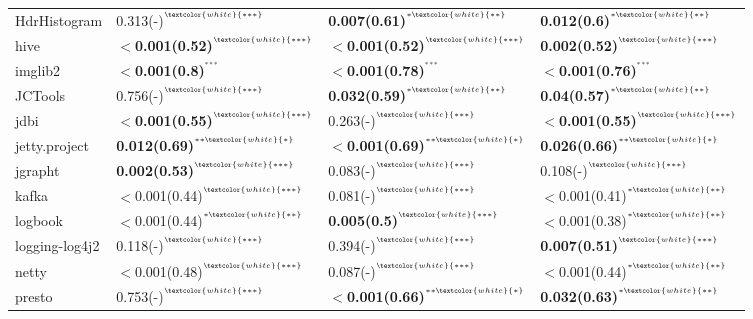 \begin{tabular}{llll}
HdrHistogram        &  0.313(-)\tiny{$^{^{\textcolor{white}{***}}}$} &  \textbf{0.007(0.61)}\tiny{$^{^{*\textcolor{white}{**}}}$} &  \textbf{0.012(0.6)}\tiny{$^{^{*\textcolor{white}{**}}}$} \\
hive                &  \textbf{$<$0.001(0.52)}\tiny{$^{^{\textcolor{white}{***}}}$} &  \textbf{$<$0.001(0.52)}\tiny{$^{^{\textcolor{white}{***}}}$} &  \textbf{0.002(0.52)}\tiny{$^{^{\textcolor{white}{***}}}$} \\
imglib2             &  \textbf{$<$0.001(0.8)}\tiny{$^{^{***}}$} &  \textbf{$<$0.001(0.78)}\tiny{$^{^{***}}$} &  \textbf{$<$0.001(0.76)}\tiny{$^{^{***}}$} \\
JCTools             &  0.756(-)\tiny{$^{^{\textcolor{white}{***}}}$} &  \textbf{0.032(0.59)}\tiny{$^{^{*\textcolor{white}{**}}}$} &  \textbf{0.04(0.57)}\tiny{$^{^{*\textcolor{white}{**}}}$} \\
jdbi                &  \textbf{$<$0.001(0.55)}\tiny{$^{^{\textcolor{white}{***}}}$} &  0.263(-)\tiny{$^{^{\textcolor{white}{***}}}$} &  \textbf{$<$0.001(0.55)}\tiny{$^{^{\textcolor{white}{***}}}$} \\
jetty.project       &  \textbf{0.012(0.69)}\tiny{$^{^{**\textcolor{white}{*}}}$} &  \textbf{$<$0.001(0.69)}\tiny{$^{^{**\textcolor{white}{*}}}$} &  \textbf{0.026(0.66)}\tiny{$^{^{**\textcolor{white}{*}}}$} \\
jgrapht             &  \textbf{0.002(0.53)}\tiny{$^{^{\textcolor{white}{***}}}$} &  0.083(-)\tiny{$^{^{\textcolor{white}{***}}}$} &  0.108(-)\tiny{$^{^{\textcolor{white}{***}}}$} \\
kafka               &  $<$0.001(0.44)\tiny{$^{^{\textcolor{white}{***}}}$} &  0.081(-)\tiny{$^{^{\textcolor{white}{***}}}$} &  $<$0.001(0.41)\tiny{$^{^{*\textcolor{white}{**}}}$} \\
logbook             &  $<$0.001(0.44)\tiny{$^{^{*\textcolor{white}{**}}}$} &  \textbf{0.005(0.5)}\tiny{$^{^{\textcolor{white}{***}}}$} &  $<$0.001(0.38)\tiny{$^{^{*\textcolor{white}{**}}}$} \\
logging-log4j2      &  0.118(-)\tiny{$^{^{\textcolor{white}{***}}}$} &  0.394(-)\tiny{$^{^{\textcolor{white}{***}}}$} &  \textbf{0.007(0.51)}\tiny{$^{^{\textcolor{white}{***}}}$} \\
netty               &  $<$0.001(0.48)\tiny{$^{^{\textcolor{white}{***}}}$} &  0.087(-)\tiny{$^{^{\textcolor{white}{***}}}$} &  $<$0.001(0.44)\tiny{$^{^{*\textcolor{white}{**}}}$} \\
presto              &  0.753(-)\tiny{$^{^{\textcolor{white}{***}}}$} &  \textbf{$<$0.001(0.66)}\tiny{$^{^{**\textcolor{white}{*}}}$} &  \textbf{0.032(0.63)}\tiny{$^{^{*\textcolor{white}{**}}}$} \\

\end{tabular}
